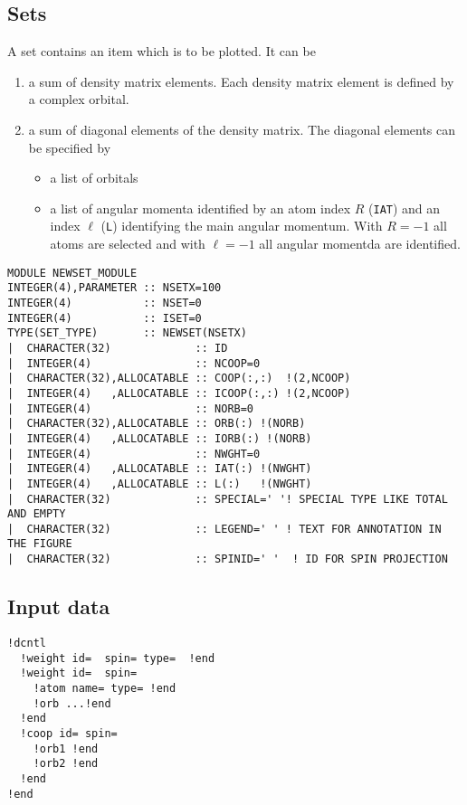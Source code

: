 \documentclass[11pt,a4paper]{report}
\begin{document}
\subsection{Sets}
A set contains an item which is to be plotted. 
It can be 
\begin{enumerate}
\item a sum of density matrix elements. Each density matrix element is
  defined by a complex orbital.
\item a sum of diagonal elements of the density matrix.
  The diagonal elements can be specified by 
  \begin{itemize}
    \item a list of orbitals
    \item a list of angular momenta identified by an atom index $R$
      (\verb|IAT|) and an index $\ell$ (\verb|L|) identifying the main
      angular momentum. With $R=-1$ all atoms are selected and with
      $\ell=-1$ all angular momentda are identified.
  \end{itemize}
\end{enumerate}


\begin{verbatim}
MODULE NEWSET_MODULE
INTEGER(4),PARAMETER :: NSETX=100
INTEGER(4)           :: NSET=0
INTEGER(4)           :: ISET=0
TYPE(SET_TYPE)       :: NEWSET(NSETX) 
|  CHARACTER(32)             :: ID
|  INTEGER(4)                :: NCOOP=0
|  CHARACTER(32),ALLOCATABLE :: COOP(:,:)  !(2,NCOOP)
|  INTEGER(4)   ,ALLOCATABLE :: ICOOP(:,:) !(2,NCOOP)
|  INTEGER(4)                :: NORB=0
|  CHARACTER(32),ALLOCATABLE :: ORB(:) !(NORB)
|  INTEGER(4)   ,ALLOCATABLE :: IORB(:) !(NORB)
|  INTEGER(4)                :: NWGHT=0
|  INTEGER(4)   ,ALLOCATABLE :: IAT(:) !(NWGHT)
|  INTEGER(4)   ,ALLOCATABLE :: L(:)   !(NWGHT)
|  CHARACTER(32)             :: SPECIAL=' '! SPECIAL TYPE LIKE TOTAL AND EMPTY
|  CHARACTER(32)             :: LEGEND=' ' ! TEXT FOR ANNOTATION IN THE FIGURE
|  CHARACTER(32)             :: SPINID=' '  ! ID FOR SPIN PROJECTION
\end{verbatim}

\subsection{Input data}

\begin{verbatim}
!dcntl
  !weight id=  spin= type=  !end
  !weight id=  spin= 
    !atom name= type= !end
    !orb ...!end
  !end
  !coop id= spin=
    !orb1 !end
    !orb2 !end
  !end
!end
\end{verbatim}
\end{document}
